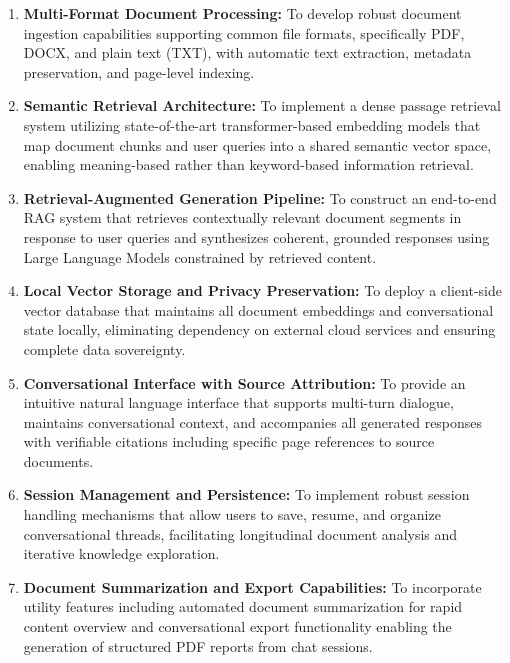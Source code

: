 \begin{enumerate}
    \item \textbf{Multi-Format Document Processing:} To develop robust document ingestion capabilities supporting common file formats, specifically PDF, DOCX, and plain text (TXT), with automatic text extraction, metadata preservation, and page-level indexing.
    
    \item \textbf{Semantic Retrieval Architecture:} To implement a dense passage retrieval system utilizing state-of-the-art transformer-based embedding models that map document chunks and user queries into a shared semantic vector space, enabling meaning-based rather than keyword-based information retrieval.
    
    \item \textbf{Retrieval-Augmented Generation Pipeline:} To construct an end-to-end RAG system that retrieves contextually relevant document segments in response to user queries and synthesizes coherent, grounded responses using Large Language Models constrained by retrieved content.
    
    \item \textbf{Local Vector Storage and Privacy Preservation:} To deploy a client-side vector database that maintains all document embeddings and conversational state locally, eliminating dependency on external cloud services and ensuring complete data sovereignty.
    
    \item \textbf{Conversational Interface with Source Attribution:} To provide an intuitive natural language interface that supports multi-turn dialogue, maintains conversational context, and accompanies all generated responses with verifiable citations including specific page references to source documents.
    
    \item \textbf{Session Management and Persistence:} To implement robust session handling mechanisms that allow users to save, resume, and organize conversational threads, facilitating longitudinal document analysis and iterative knowledge exploration.
    
    \item \textbf{Document Summarization and Export Capabilities:} To incorporate utility features including automated document summarization for rapid content overview and conversational export functionality enabling the generation of structured PDF reports from chat sessions.
    

\end{enumerate}
